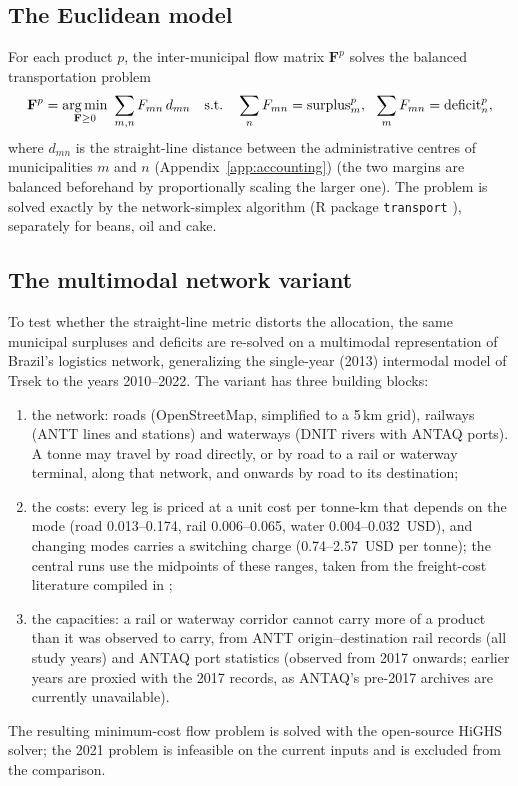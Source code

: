 \subsection{The Euclidean model}\label{subsubsec:euclid}
For each product
$p$, the inter-municipal flow matrix $\mathbf{F}^p$ solves the balanced
transportation problem
\begin{equation}\label{eq:ot}
  \mathbf{F}^{p}=\operatorname*{arg\,min}_{\mathbf{F}\ge0}\ \sum_{m,n}F_{mn}\,d_{mn}
  \quad\text{s.t.}\quad
  \sum_{n}F_{mn}=\text{surplus}^p_m,\ \
  \sum_{m}F_{mn}=\text{deficit}^p_n,
\end{equation}
where $d_{mn}$ is the straight-line distance between the administrative
centres of municipalities $m$ and $n$ (Appendix~\ref{app:accounting}) (the two margins are balanced beforehand by
proportionally scaling the larger one). The problem is solved exactly by
the network-simplex algorithm (R package \texttt{transport}
\cite{schuhmacher2023transport}), separately for beans, oil and cake.

\subsection{The multimodal network variant}\label{subsubsec:multimode}
To test whether the straight-line metric distorts the allocation, the
same municipal surpluses and deficits are re-solved on a multimodal
representation of Brazil's logistics network, generalizing the
single-year (2013) intermodal model of Trsek \cite{trsek2022} to the
years 2010--2022. The variant has three building blocks:
\begin{enumerate}
\item the network: roads (OpenStreetMap, simplified to a 5\,km grid),
railways (ANTT lines and stations) and waterways (DNIT rivers with
ANTAQ ports). A tonne may travel by road directly, or by road to a
rail or waterway terminal, along that network, and onwards by road to
its destination;
\item the costs: every leg is priced at a unit cost per tonne-km that
depends on the mode (road 0.013--0.174, rail 0.006--0.065, water
0.004--0.032~USD), and changing modes carries a switching charge
(0.74--2.57~USD per tonne); the central runs use the midpoints of
these ranges, taken from the freight-cost literature compiled in
\cite{trsek2022};
\item the capacities: a rail or waterway corridor cannot carry more of
a product than it was observed to carry, from ANTT
origin--destination rail records (all study years) and ANTAQ port
statistics (observed from 2017 onwards; earlier years are proxied with
the 2017 records, as ANTAQ's pre-2017 archives are currently
unavailable).
\end{enumerate}
The resulting minimum-cost flow problem is solved with the open-source
HiGHS solver; the 2021 problem is infeasible on the current inputs and
is excluded from the comparison.

